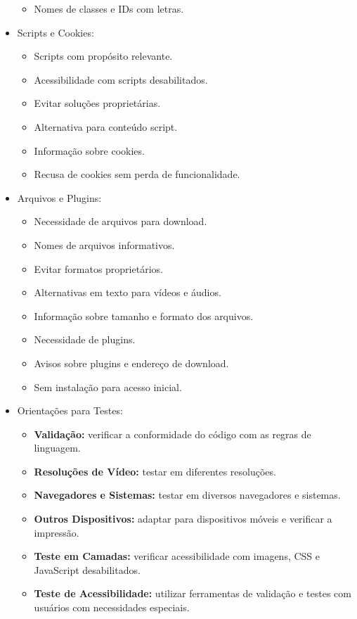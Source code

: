 \documentclass[
  12pt,
  openright,
  twoside,
  a4paper,
  english,
  french,
  spanish,
  brazil
]{abntex2}
\begin{document}
\begin{itemize}
\begin{itemize}
    \item Nomes de classes e IDs com letras.
  \end{itemize}
  \item Scripts e Cookies:
  \begin{itemize}
    \item Scripts com propósito relevante.
    \item Acessibilidade com scripts desabilitados.
    \item Evitar soluções proprietárias.
    \item Alternativa para conteúdo script.
    \item Informação sobre cookies.
    \item Recusa de cookies sem perda de funcionalidade.
  \end{itemize}
  \item Arquivos e Plugins:
  \begin{itemize}
    \item Necessidade de arquivos para download.
    \item Nomes de arquivos informativos.
    \item Evitar formatos proprietários.
    \item Alternativas em texto para vídeos e áudios.
    \item Informação sobre tamanho e formato dos arquivos.
    \item Necessidade de plugins.
    \item Avisos sobre plugins e endereço de download.
    \item Sem instalação para acesso inicial.
  \end{itemize}
  \item Orientações para Testes:
  \begin{itemize}
    \item \textbf{Validação:} verificar a conformidade do código com as regras de linguagem.
    \item \textbf{Resoluções de Vídeo:} testar em diferentes resoluções.
    \item \textbf{Navegadores e Sistemas:} testar em diversos navegadores e sistemas.
    \item \textbf{Outros Dispositivos:} adaptar para dispositivos móveis e verificar a impressão.
    \item \textbf{Teste em Camadas:} verificar acessibilidade com imagens, CSS e JavaScript desabilitados.
    \item \textbf{Teste de Acessibilidade:} utilizar ferramentas de validação e testes com usuários com necessidades especiais.

\end{itemize}
\end{itemize}
\end{document}

